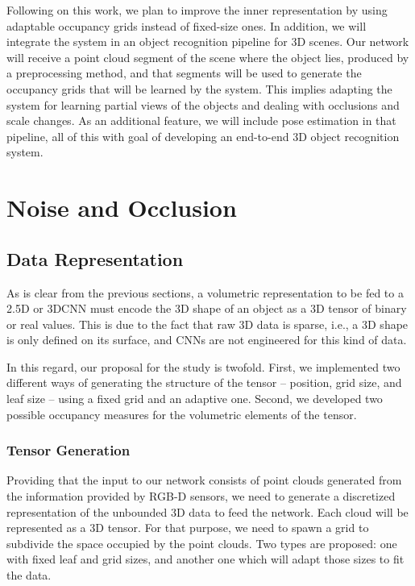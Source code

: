 Following on this work, we plan to improve the inner representation by using adaptable occupancy grids instead of fixed-size ones. In addition, we will integrate the system in an object recognition pipeline for 3D scenes. Our network will receive a point cloud segment of the scene where the object lies, produced by a preprocessing method, and that segments will be used to generate the occupancy grids that will be learned by the system. This implies adapting the system for learning partial views of the objects and dealing with occlusions and scale changes. As an additional feature, we will include pose estimation in that pipeline, all of this with goal of developing an end-to-end 3D object recognition system.

\section{Noise and Occlusion}
\label{cha:objrecog:sec:study}

\subsection{Data Representation}
\label{cha:objrecog:sec:study:subsec:representation}

As is clear from the previous sections, a volumetric representation to be fed to a \acs{2.5D} or \acs{3D}\acs{CNN} must encode the \acs{3D} shape of an object as a \acs{3D} tensor of binary or real values. This is due to the fact that raw \acs{3D} data is sparse, i.e., a \acs{3D} shape is only defined on its surface, and \acp{CNN} are not engineered for this kind of data.

In this regard, our proposal for the study is twofold. First, we implemented two different ways of generating the structure of the tensor -- position, grid size, and leaf size -- using a fixed grid and an adaptive one. Second, we developed two possible occupancy measures for the volumetric elements of the tensor.

\subsubsection{Tensor Generation}
\label{cha:objrecog:sec:study:subsec:representation:subsubsec:tensor}

Providing that the input to our network consists of point clouds generated from the information provided by \acs{RGB-D} sensors, we need to generate a discretized representation of the unbounded \acs{3D} data to feed the network. Each cloud will be represented as a \acs{3D} tensor. For that purpose, we need to spawn a grid to subdivide the space occupied by the point clouds. Two types are proposed: one with fixed leaf and grid sizes, and another one which will adapt those sizes to fit the data.

